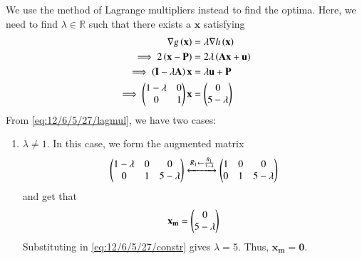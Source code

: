 \documentclass[journal,12pt,twocolumn]{IEEEtran}
\renewcommand{\vec}[1]{\boldsymbol{\mathbf{#1}}}
\begin{document}
\begin{enumerate}
    We use the method of Lagrange multipliers instead to find the optima. Here, 
    we need to find $\lambda \in \mathbb{R}$ such that there exists a $\vec{x}$ 
    satisfying
    \begin{align}
        \nabla g\brak{\vec{x}} &= \lambda\nabla h\brak{\vec{x}} \\
        \implies 2\brak{\vec{x}-\vec{P}} &= 2\lambda\brak{\vec{Ax}+\vec{u}} \\
        \implies \brak{\vec{I}-\lambda\vec{A}}\vec{x} &= \lambda\vec{u} + \vec{P} \\
        \implies \myvec{1-\lambda&0\\0&1}\vec{x} &= \myvec{0\\5-\lambda}
        \label{eq:12/6/5/27/lagmul}
    \end{align}
    From \eqref{eq:12/6/5/27/lagmul}, we have two cases:
    \begin{enumerate}
        \item $\lambda \neq 1$. In this case, we form the augmented matrix
        \begin{align}
            \begin{pmatrix}1-\lambda&0&0\\0&1&5-\lambda\end{pmatrix} \xleftrightarrow[]{R_1 \leftarrow \frac{R_1}{1-\lambda}} \begin{pmatrix}1&0&0\\0&1&5-\lambda\end{pmatrix}
        \end{align}
        and get that
        \begin{align}
            \vec{x_m} = \myvec{0\\5-\lambda}
        \end{align}
        Substituting in \eqref{eq:12/6/5/27/constr} gives $\lambda = 5$. Thus, 
        $\vec{x_m} = \vec{0}$.


\end{enumerate}
\end{enumerate}
\end{document}
